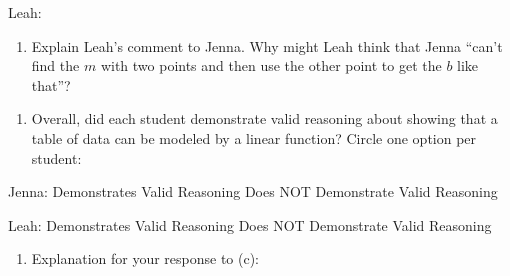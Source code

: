 \documentclass[10pt]{article}
\begin{document}
\begin{enumerate}[resume]
		\vspace*{-16pt}\begin{mdframed} Leah: \vspace*{1.2in} \end{mdframed}
		
	\begin{enumerate}[resume]
	\item Explain Leah's comment to Jenna. Why might Leah think that Jenna ``can't find the $m$ with two points and then use the other point to get the $b$ like that''?
	\end{enumerate}
	
	\vspace*{-12pt}\begin{mdframed}  \vspace*{1.3in} \end{mdframed}
	
	\vspace*{-12pt}
	\begin{enumerate}[resume]
	\item Overall, did each student demonstrate valid reasoning about showing that a table of data can be modeled by a linear function? Circle one option per student:
	\end{enumerate}
		
	\vspace*{-12pt}\begin{mdframed} Jenna: \quad Demonstrates Valid Reasoning \quad\quad\quad Does NOT Demonstrate Valid Reasoning \end{mdframed}
	\vspace*{-16pt}\begin{mdframed} Leah: \quad Demonstrates Valid Reasoning \quad\quad\quad Does NOT Demonstrate Valid Reasoning \end{mdframed}

		
	\vspace*{-12pt}
	\begin{enumerate}[resume]
	\item Explanation for your response to (c):
	\end{enumerate}
	
	\vspace*{-8pt}
		\begin{mdframed} \vspace*{1in} \end{mdframed}	
\end{enumerate} 
 
\end{document}
